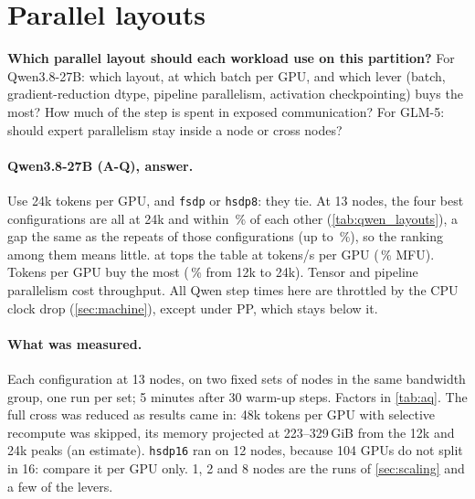 \section{Parallel layouts}
\label{sec:layouts}

\begin{question}
  \textbf{Which parallel layout should each workload use on this partition?} For Qwen3.8-27B: which layout,
  at which batch per GPU, and which lever (batch, gradient-reduction dtype, pipeline parallelism,
  activation checkpointing) buys the most? How much of the step is spent in exposed communication? For
  GLM-5: should expert parallelism stay inside a node or cross nodes?
\end{question}

\paragraph{Qwen3.8-27B (A-Q), answer.} Use 24k tokens per GPU, and \texttt{fsdp} or \texttt{hsdp8}: they tie. At 13 nodes, the four best configurations are all at 24k and within \TriLayoutTopGap\,\% of each other (\cref{tab:qwen_layouts}), a gap the same as the repeats of those configurations (up to \TriLayoutTopRepeat\,\%), so the ranking among them means little. \texttt{\TriQwenBestLayout} at \TriQwenBestTokens{} tops the table at \TriQwenBestTokS{} tokens/s per GPU (\TriQwenBestMFU\,\% MFU). Tokens per GPU buy the most (\TriLevTokens\,\% from 12k to 24k). Tensor and pipeline parallelism cost throughput. All Qwen step times here are throttled by the CPU clock drop (\cref{sec:machine}), except under PP, which stays below it.

\paragraph{What was measured.} Each configuration at 13 nodes, on two fixed sets of nodes in the same bandwidth group, one run per set; 5 minutes after 30 warm-up steps. Factors in \cref{tab:aq}. The full cross was reduced as results came in: 48k tokens per GPU with selective recompute was skipped, its memory projected at 223--329\,GiB from the 12k and 24k peaks (an estimate). \texttt{hsdp16} ran on 12 nodes, because 104 GPUs do not split in 16: compare it per GPU only. 1, 2 and 8 nodes are the runs of \cref{sec:scaling} and a few of the levers.

